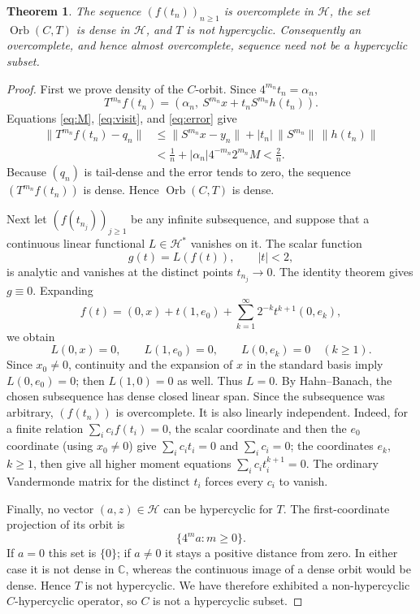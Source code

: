 \documentclass[11pt]{article}
\newtheorem{theorem}{Theorem}
\newcommand{\C}{\mathbb C}
\newcommand{\Orb}{\operatorname{Orb}}
\begin{document}
\begin{theorem}\label{thm:main}
The sequence $(f(t_n))_{n\geq1}$ is overcomplete in $\mathcal H$, the set $\Orb(C,T)$ is dense in $\mathcal H$, and $T$ is not hypercyclic.  Consequently an overcomplete, and hence almost overcomplete, sequence need not be a hypercyclic subset.
\end{theorem}

\begin{proof}
First we prove density of the $C$-orbit.  Since $4^{m_n}t_n=\alpha_n$,
\[
 T^{m_n}f(t_n)
 =\left(\alpha_n,\ S^{m_n}x+t_nS^{m_n}h(t_n)\right).
\]
Equations \eqref{eq:M}, \eqref{eq:visit}, and \eqref{eq:error} give
\begin{align*}
 \|T^{m_n}f(t_n)-q_n\|
 &\leq \|S^{m_n}x-y_n\|+|t_n|\,\|S^{m_n}\|\,\|h(t_n)\|\\
 &<\frac1n+|\alpha_n|4^{-m_n}2^{m_n}M
 <\frac2n.
\end{align*}
Because $(q_n)$ is tail-dense and the error tends to zero, the sequence $(T^{m_n}f(t_n))$ is dense.  Hence $\Orb(C,T)$ is dense.

Next let $(f(t_{n_j}))_{j\geq1}$ be any infinite subsequence, and suppose that a continuous linear functional $L\in\mathcal H^*$ vanishes on it.  The scalar function
\[
 g(t)=L(f(t)),\qquad |t|<2,
\]
is analytic and vanishes at the distinct points $t_{n_j}\to0$.  The identity theorem gives $g\equiv0$.  Expanding
\[
 f(t)=(0,x)+t(1,e_0)
       +\sum_{k=1}^{\infty}2^{-k}t^{k+1}(0,e_k),
\]
we obtain
\[
 L(0,x)=0,\qquad L(1,e_0)=0,
 \qquad L(0,e_k)=0\quad(k\geq1).
\]
Since $x_0\neq0$, continuity and the expansion of $x$ in the standard basis imply $L(0,e_0)=0$; then $L(1,0)=0$ as well.  Thus $L=0$.  By Hahn--Banach, the chosen subsequence has dense closed linear span.  Since the subsequence was arbitrary, $(f(t_n))$ is overcomplete.  It is also linearly independent.  Indeed, for a finite relation $\sum_i c_i f(t_i)=0$, the scalar coordinate and then the $e_0$ coordinate (using $x_0\neq0$) give $\sum_i c_it_i=0$ and $\sum_i c_i=0$; the coordinates $e_k$, $k\geq1$, then give all higher moment equations $\sum_i c_it_i^{k+1}=0$.  The ordinary Vandermonde matrix for the distinct $t_i$ forces every $c_i$ to vanish.

Finally, no vector $(a,z)\in\mathcal H$ can be hypercyclic for $T$.  The first-coordinate projection of its orbit is
\[
 \{4^m a:m\geq0\}.
\]
If $a=0$ this set is $\{0\}$; if $a\neq0$ it stays a positive distance from zero.  In either case it is not dense in $\C$, whereas the continuous image of a dense orbit would be dense.  Hence $T$ is not hypercyclic.  We have therefore exhibited a non-hypercyclic $C$-hypercyclic operator, so $C$ is not a hypercyclic subset.
\end{proof}
\end{document}
